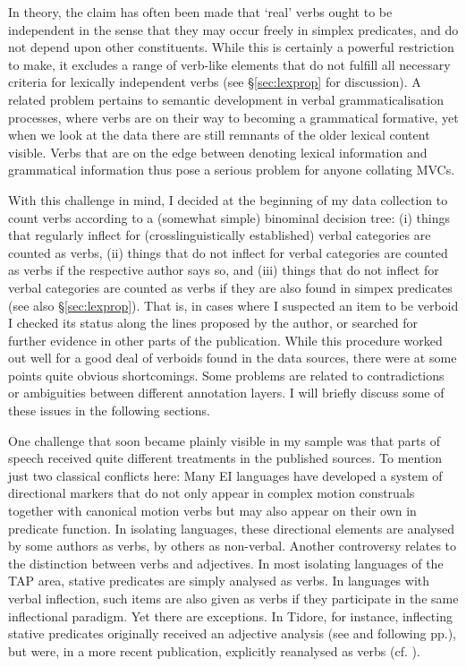 In theory, the claim has often been made that `real' verbs ought to be independent in the sense that they may occur freely in simplex predicates, and do not depend upon other constituents. While this is certainly a powerful restriction to make, it excludes a range of verb-like elements that do not fulfill all necessary criteria for lexically independent verbs (see §\ref{sec:lexprop} for discussion). A related problem pertains to semantic development in verbal grammaticalisation processes, where verbs are on their way to becoming a grammatical formative, yet when we look at the data there are still remnants of the older lexical content visible. Verbs that are on the edge between denoting lexical information and grammatical information thus pose a serious problem for anyone collating MVCs.

With this challenge in mind, I decided at the beginning of my data collection to count verbs according to a (somewhat simple) binominal decision tree: (i) things that regularly inflect for (crosslinguistically established) verbal categories are counted as verbs, (ii) things that do not inflect for verbal categories are counted as verbs if the respective author says so, and (iii) things that do not inflect for verbal categories are counted as verbs if they are also found in simpex predicates (see also §\ref{sec:lexprop}). That is, in cases where I suspected an item to be verboid I checked its status along the lines proposed by the author, or searched for further evidence in other parts of the publication. While this procedure worked out well for a good deal of verboids found in the data sources, there were at some points quite obvious shortcomings. Some problems are related to contradictions or ambiguities between different annotation layers. I will briefly discuss some of these issues in the following sections.

One challenge that soon became plainly visible in my sample was that parts of speech received quite different treatments in the published sources. To mention just two classical conflicts here: Many EI languages have developed a system of directional markers that do not only appear in complex motion construals together with canonical motion verbs but may also appear on their own in predicate function. In isolating languages, these directional elements are analysed by some authors as verbs, by others as non-verbal. Another controversy relates to the distinction between verbs and adjectives. In most isolating languages of the TAP area, stative predicates are simply analysed as verbs. In languages with verbal inflection, such items are also given as verbs if they participate in the same inflectional paradigm. Yet there are exceptions. In Tidore, for instance, inflecting stative predicates originally received an adjective analysis (see \citealt[81]{vanstaden2000tidore} and following pp.), but were, in a more recent publication, explicitly reanalysed as verbs (cf. \citealt[46]{vanstaden2008serial}). 

